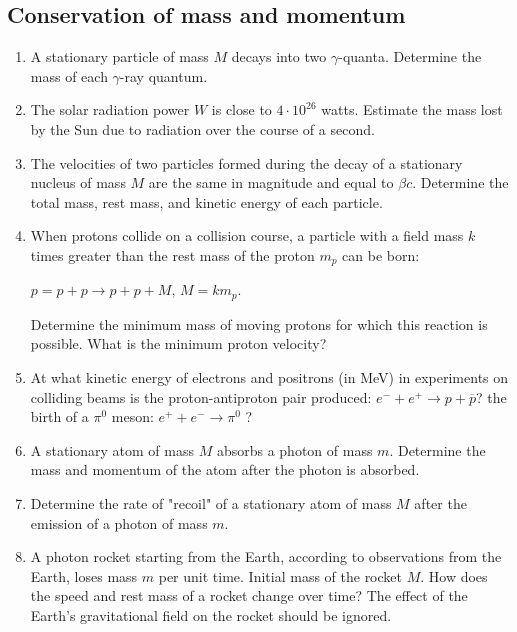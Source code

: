 \documentclass{article}
\begin{document}
\subsection{Conservation of mass and momentum}
\begin{enumerate}[label=14.5.\arabic*]

\item A stationary particle of mass $M$ decays into two $\gamma$-quanta. Determine the mass of each $\gamma$-ray quantum.

\item The solar radiation power $W$ is close to $4 \cdot 10^{26}$ watts. Estimate the mass lost by the Sun due to radiation over the course of a second.

\item The velocities of two particles formed during the decay of a stationary nucleus of mass $M$ are the same in magnitude and equal to $\beta c$. Determine the total mass, rest mass, and kinetic energy of each particle.

\item When protons collide on a collision course, a particle with a field mass $k$ times greater than the rest mass of the proton $m_p$ can be born:

$p = p + p \to p + p + M$, $M = k m_p$.

Determine the minimum mass of moving protons for which this reaction is possible. What is the minimum proton velocity?

\item At what kinetic energy of electrons and positrons (in MeV) in experiments on colliding beams is the proton-antiproton pair produced: $e^- + e^+ \to p + \overline{p}$? the birth of a $\pi^0$ meson: $e^+ + e^- \to \pi^0$ ?

\item A stationary atom of mass $M$ absorbs a photon of mass $m$. Determine the mass and momentum of the atom after the photon is absorbed.

\item Determine the rate of "recoil" of a stationary atom of mass $M$ after the emission of a photon of mass $m$.

\item A photon rocket starting from the Earth, according to observations from the Earth, loses mass $m$ per unit time. Initial mass of the rocket $M$. How does the speed and rest mass of a rocket change over time? The effect of the Earth's gravitational field on the rocket should be ignored.


\end{enumerate}
\end{document}
